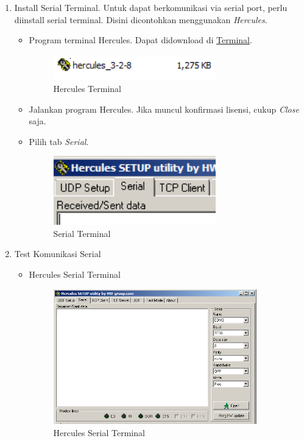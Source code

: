 \documentclass{article}
\begin{document}
\begin{enumerate}
		\item Install Serial Terminal.
		Untuk dapat berkomunikasi via serial port, perlu diinstall serial terminal.
		Disini dicontohkan menggunakan \textit{Hercules}.

		\begin{itemize}
			\item Program terminal Hercules. Dapat didownload di \href{https://drive.google.com/drive/folders/1fgNPnGeSm20TrFfwmeCa4B24WIN_t_o_?usp=share_link}{Terminal}.
			\begin{figure}[H]
				\centering
				\includegraphics[width=200pt]{images/software/hercules}
				\caption{Hercules Terminal}
			\end{figure}

			\item Jalankan program Hercules.
			Jika muncul konfirmasi lisensi, cukup \textit{Close} saja.

			\item Pilih tab \textit{Serial}.
			\begin{figure}[H]
				\centering
				\includegraphics[width=200pt]{images/software/hercules_serial}
				\caption{Serial Terminal}
			\end{figure}
		\end{itemize}

		\item Test Komunikasi Serial
		\begin{itemize}
			\item Hercules Serial Terminal
			\begin{figure}[H]
				\centering
				\includegraphics[width=250pt]{images/software/hercules_terminal}
				\caption{Hercules Serial Terminal}
			\end{figure}


\end{itemize}
\end{enumerate}
\end{document}
